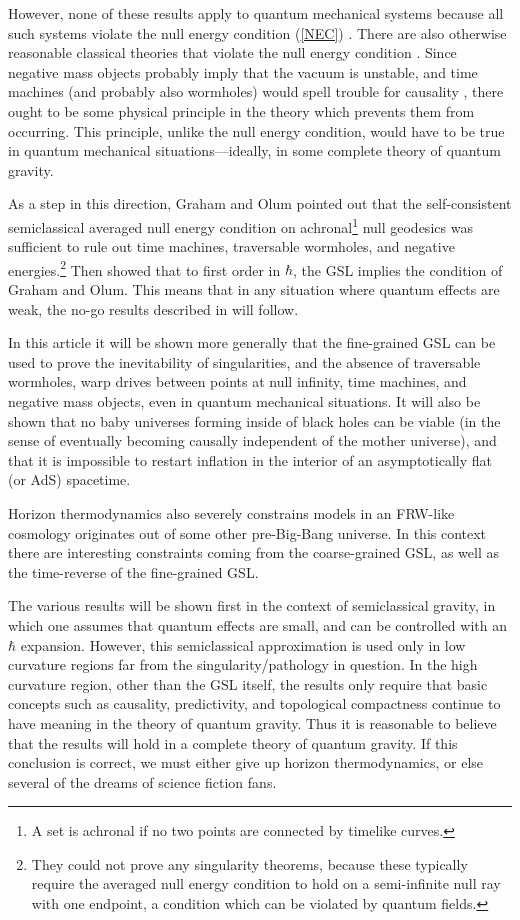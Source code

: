 \documentclass{article}
\begin{document}
However, none of these results apply to quantum mechanical systems because all such systems violate the null energy condition (\ref{NEC}) \cite{neg}.  There are also otherwise reasonable classical theories that violate the null energy condition \cite{visser}.  Since negative mass objects probably imply that the vacuum is unstable, and time machines (and probably also wormholes) would spell trouble for causality \cite{noctc}, there ought to be some physical principle in the theory which prevents them from occurring.  This principle, unlike the null energy condition, would have to be true in quantum mechanical situations---ideally, in some complete theory of quantum gravity.

As a step in this direction, Graham and Olum \cite{GO} pointed out that the self-consistent semiclassical averaged null energy condition on achronal\footnote{A set is achronal if no two points are connected by timelike curves.} null geodesics was sufficient to rule out time machines, traversable wormholes, and negative energies.\footnote{They could not prove any singularity theorems, because these typically require the averaged null energy condition to hold on a semi-infinite null ray with one endpoint, a condition which can be violated by quantum fields.} Then \cite{anec} showed that to first order in $\hbar$, the GSL implies the condition of Graham and Olum.  This means that in any situation where quantum effects are weak, the no-go results described in \cite{GO} will follow.

In this article it will be shown more generally that the fine-grained GSL can be used to prove the inevitability of singularities, and the absence of traversable wormholes, warp drives between points at null infinity, time machines, and negative mass objects, even in quantum mechanical situations.  It will also be shown that no baby universes forming inside of black holes can be viable (in the sense of eventually becoming causally independent of the mother universe), and that it is impossible to restart inflation in the interior of an asymptotically flat (or AdS) spacetime.  

Horizon thermodynamics also severely constrains models in an FRW-like cosmology originates out of some other pre-Big-Bang universe.  In this context there are interesting constraints coming from the coarse-grained GSL, as well as the time-reverse of the fine-grained GSL. 

The various results will be shown first in the context of semiclassical gravity, in which one assumes that quantum effects are small, and can be controlled with an $\hbar$ expansion.  However, this semiclassical approximation is used only in low curvature regions far from the singularity/pathology in question.  In the high curvature region, other than the GSL itself, the results only require that basic concepts such as causality, predictivity, and topological compactness continue to have meaning in the theory of quantum gravity.  Thus it is reasonable to believe that the results will hold in a complete theory of quantum gravity.  If this conclusion is correct, we must either give up horizon thermodynamics, or else several of the dreams of science fiction fans.
\end{document}
